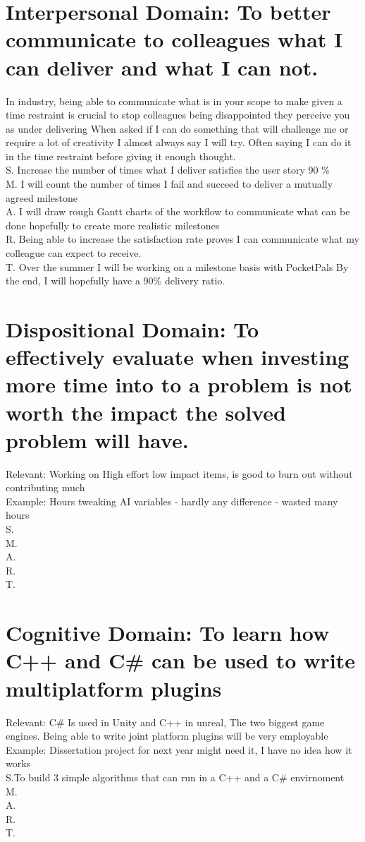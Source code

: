 \documentclass{scrartcl}
\begin{document}
\section{Interpersonal Domain: To better communicate to colleagues what I can deliver and what I can not.}
In industry, being able to communicate what is in your scope to make given a time restraint is crucial to stop colleagues
being disappointed they perceive you as under delivering
When asked if I can do something that will challenge me or require a lot of creativity I almost always say I will try.
Often saying I can do it in the time restraint before giving it enough thought. \\
S. Increase the number of times what I deliver satisfies the user story 90 \% \\
M. I will count the number of times I fail and succeed to deliver a mutually agreed milestone\\
A. I will draw rough Gantt charts of the workflow to communicate what can be done hopefully to create more realistic milestones \\
R. Being able to increase the satisfaction rate proves I can communicate what my colleague can expect to receive.\\
T. Over the summer I will be working on a milestone basis with PocketPals By the end, I will hopefully have a 90\%  delivery ratio.\\

\section{Dispositional Domain: To effectively evaluate when investing more time into to a problem is not worth the impact the solved problem will have.}
Relevant: Working on High effort low impact items, is good to burn out without contributing much\\
Example: Hours tweaking AI variables - hardly any difference - wasted many hours\\
S.\\
M.\\
A.\\
R.\\
T. \\

\section{Cognitive Domain: To learn how C++ and C\#  can be used to write multiplatform plugins}
Relevant: C\# Is used in Unity and C++ in unreal, The two biggest game engines. Being able to write joint platform plugins will be very employable\\
Example: Dissertation project for next year might need it, I have no idea how it works  \\
S.To build 3 simple algorithms that can run in a C++ and a C\# envirnoment\\
M.\\
A.\\
R.\\
T. \\
\end{document}
